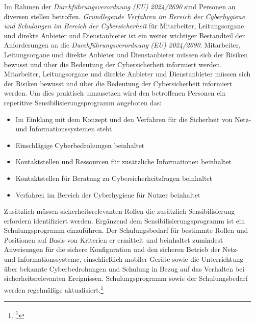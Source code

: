 \documentclass[11pt,a4paper,hidelinks]{article}   %
\begin{document}
                Im Rahmen der \emph{Durchführungsverordnung (EU) 2024/2690} sind Personen an diversen stellen betroffen. \emph{Grundlegende Verfahren im Bereich der Cyberhygiene und Schulungen im Bereich der Cybersicherheit} für Mitarbeiter, Leitungsorgane und direkte Anbieter und Dienstanbieter ist ein weiter wichtiger Bestandteil der Anforderungen an die \emph{Durchführungsverordnung (EU) 2024/2690}. Mitarbeiter, Leitungsorgane und direkte Anbieter und Dienstanbieter müssen sich der Risiken bewusst und über die Bedeutung der Cybersicherheit informiert werden. Mitarbeiter, Leitungsorgane und direkte Anbieter und Dienstanbieter müssen sich der Risiken bewusst und über die Bedeutung der Cybersicherheit informiert werden. Um dies praktisch umzusetzen wird den betroffenen Personen ein repetitive Sensibilisierungsprogramm angeboten das:
                \begin{itemize}
                    \item Im Einklang mit dem Konzept und den Verfahren für die Sicherheit von Netz- und Informationssystemen steht
                    \item Einschlägige Cyberbedrohungen beinhaltet
                    \item Kontaktstellen und Ressourcen für zusätzliche Informationen beinhaltet
                    \item Kontaktstellen für Beratung zu Cybersicherheitsfragen beinhaltet
                    \item Verfahren im Bereich der Cyberhygiene für Nutzer beinhaltet
                \end{itemize} Zusätzlich müssen sicherheitsrelevanten Rollen die zusätzlich Sensibilisierung erfordern identifiziert werden. Ergänzend dem Sensibilisierungsprogramm ist ein Schulungsprogramm einzuführen. Der Schulungsbedarf für bestimmte Rollen und Positionen auf Basis von Kriterien er ermittelt und beinhaltet zumindest Anweisungen für die sichere Konfiguration und den sicheren Betrieb der Netz- und Informationssysteme, einschließlich mobiler Geräte sowie die Unterrichtung über bekannte Cyberbedrohungen und Schulung in Bezug auf das Verhalten bei sicherheitsrelevanten Ereignissen. Schulungsprogramm sowie der Schulungsbedarf werden regelmäßige aktualisiert.\footnote{
                    \footcite[Vgl. Anhang, Nummer 8][]{EU2024-2690}
                }\medbreak
\end{document}
